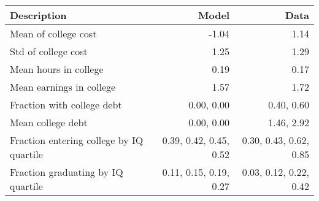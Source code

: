 \begin{tabular}{lrr}
\hline
Description & Model  & Data  \\
\hline
Mean of college cost & -1.04  & 1.14  \\
Std of college cost & 1.25  & 1.29  \\
Mean hours in college & 0.19  & 0.17  \\
Mean earnings in college & 1.57  & 1.72  \\
Fraction with college debt & 0.00, 0.00  & 0.40, 0.60  \\
Mean college debt & 0.00, 0.00  & 1.46, 2.92  \\
Fraction entering college by IQ quartile & 0.39, 0.42, 0.45, 0.52  & 0.30, 0.43, 0.62, 0.85  \\
Fraction graduating by IQ quartile & 0.11, 0.15, 0.19, 0.27  & 0.03, 0.12, 0.22, 0.42  \\
\hline
\end{tabular}%
